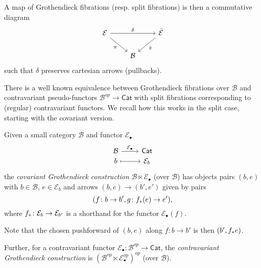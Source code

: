 \documentclass[a4paper,10pt]{article}%
\begin{document}
A map of Grothendieck fibrations (resp. split fibrations) is then a commutative diagram
\begin{equation}
\begin{tikzcd}\label{GROTHFIBMAP EQ}
	\mathcal{E} \ar{rr}{\delta} \ar{rd}[swap]{\pi} &&
	\bar{\mathcal{E}} \ar{dl}{\bar{\pi}}
\\
	& \mathcal{B}
\end{tikzcd}
\end{equation}
such that $\delta$ preserves cartesian arrows (pullbacks).


There is a well known equivalence between Grothendieck fibrations over $\mathcal{B}$ and contravariant pseudo-functors
$\mathcal{B}^{op} \to \mathsf{Cat}$
with split fibrations corresponding to (regular) contravariant functors. We recall how this works in the split case, starting with the covariant version.

\begin{definition}\label{GROTHCONS DEF}
Given a small category $\mathcal{B}$ and functor $\mathcal{E}_{\bullet}$
\begin{equation}
\begin{tikzcd}[row sep = 0em]
	\mathcal{B} \ar{r}{\mathcal{E}_{\bullet}} & \mathsf{Cat} \\
	b \ar[mapsto]{r} & \mathcal{E}_b
\end{tikzcd}
\end{equation}
the \textit{covariant Grothendieck construction}
$\mathcal{B} \ltimes \mathcal{E}_{\bullet}$ (over $\mathcal B$)
has objects pairs $(b,e)$ with $b \in \mathcal{B}$,
$e \in \mathcal{E}_b$ and 
arrows $(b,e) \to (b',e')$ given by pairs
\[(f\colon b \to b', g \colon f_{\**}(e) \to e'),\]
where $f_{\**}\colon \mathcal{E}_b \to \mathcal{E}_{b'}$ is a shorthand for the functor $\mathcal{E}_{\bullet}(f)$.

Note that the chosen pushforward of $(b,e)$ along 
$f \colon b \to b'$ is then $(b',f_{\**} e)$.

Further, for a contravariant functor
$\mathcal{E}_{\bullet} \colon
\mathcal{B}^{op} \to \mathsf{Cat}$,
the \textit{contravariant Grothendieck construction} is
$(\mathcal{B}^{op} \ltimes 
\mathcal{E}_{\bullet}^{op})^{op}$
(over $\mathcal B$).
\end{definition}
\end{document}
